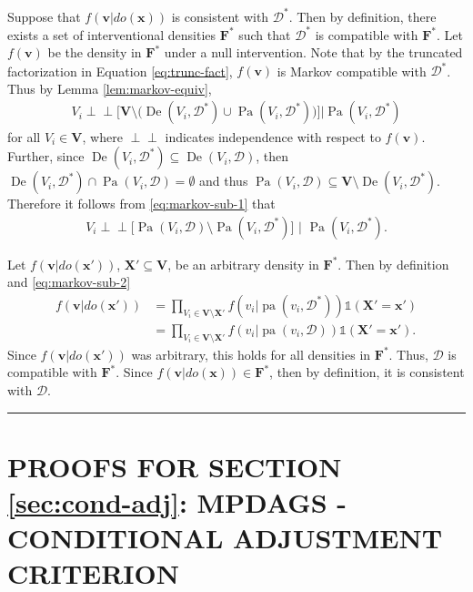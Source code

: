 \documentclass[twoside]{article}
\DeclareMathOperator{\Pa}{Pa}
\DeclareMathOperator{\pa}{pa}
\DeclareMathOperator{\De}{De}
\newcommand{\mb}[1]{\mathbf{#1}}
\newcommand{\g}[1][G]{\mathcal{#1}}
\newcommand{\ind}{\perp\!\!\!\!\perp}
\newenvironment{proofof}[1][]{\begin{trivlist}
\item[\hskip \labelsep {\bfseries Proof of #1.}]}{\hfill\BlackBox\end{trivlist}}
\newcommand{\BlackBox}{\rule{1.5ex}{1.5ex}}
\begin{document}
\begin{proofof}[Lemma \ref{lem:markov-sub}]
    Suppose that $f(\mb{v} | do(\mb{x}))$ is consistent with $\g[D]^*$. Then by definition, there exists a set of interventional densities $\mb{F^*}$ such that $\g[D]^*$ is compatible with $\mb{F^*}$. Let $f(\mb{v})$ be the density in $\mb{F^*}$ under a null intervention. Note that by the truncated factorization in Equation \eqref{eq:trunc-fact}, $f(\mb{v})$ is Markov compatible with $\g[D]^*$. Thus by Lemma \ref{lem:markov-equiv},
    \begin{align}
        V_i \ind \Big[ \mb{V} \setminus \big( \De(V_i, \g[D]^*) \cup \Pa(V_i,\g[D]^*) \big) \Big] | \Pa(V_i, \g[D]^*) \label{eq:markov-sub-1}
    \end{align}
    for all $V_i \in \mb{V}$, where $\ind$ indicates independence with respect to $f(\mb{v})$. Further, since $\De(V_i,\g[D]^*) \subseteq \De(V_i,\g[D])$, then $\De(V_i,\g[D]^*) \cap \Pa(V_i,\g[D]) = \emptyset$ and thus $\Pa(V_i,\g[D]) \subseteq \mb{V} \setminus \De(V_i, \g[D]^*)$. Therefore it follows from \eqref{eq:markov-sub-1} that
    \begin{align} 
        V_i \ind \Big[ \Pa(V_i,\g[D]) \setminus \Pa(V_i,\g[D]^*) \Big] \,\, \Big| \,\, \Pa(V_i,\g[D]^*). \label{eq:markov-sub-2}
    \end{align}
    
    Let $f(\mb{v} | do(\mb{x'}))$, $\mb{X'} \subseteq \mb{V}$, be an arbitrary density in $\mb{F^*}$. Then by definition and \eqref{eq:markov-sub-2}
    \begin{align*}
        f(\mb{v} | do(\mb{x'})) &= \prod_{V_i \in \mb{V} \setminus \mb{X'}} f(v_i|\pa(v_i,\g[D]^*)) \mathds{1}(\mb{X'} = \mb{x'})\\
                                &= \prod_{V_i \in \mb{V} \setminus \mb{X'}} f(v_i|\pa(v_i,\g[D])) \mathds{1}(\mb{X'} = \mb{x'}).
    \end{align*}
    Since $f(\mb{v} | do(\mb{x'}))$ was arbitrary, this holds for all densities in $\mb{F^*}$. Thus, $\g[D]$ is compatible with $\mb{F^*}$. Since $f(\mb{v} | do(\mb{x})) \in \mb{F^*}$, then by definition, it is consistent with $\g[D]$.
\end{proofof}









\section{PROOFS FOR SECTION \ref{sec:cond-adj}: MPDAGS - CONDITIONAL ADJUSTMENT CRITERION} 
\label{supp:adjustment}
\end{document}
